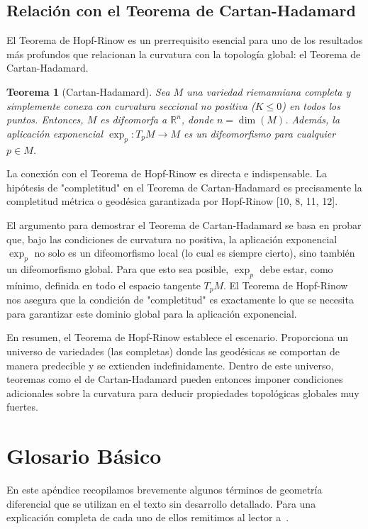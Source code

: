 \documentclass[12pt, a4paper]{report}
\theoremstyle{miestilo}
\newtheorem{teorema}{Teorema}[chapter]
\theoremstyle{midefinicion}
\begin{document}
\section{Relación con el Teorema de Cartan-Hadamard}

El Teorema de Hopf-Rinow es un prerrequisito esencial para uno de los resultados más profundos que relacionan la curvatura con la topología global: el Teorema de Cartan-Hadamard.

\begin{teorema}[Cartan-Hadamard]
Sea $M$ una variedad riemanniana completa y simplemente conexa con curvatura seccional no positiva ($K \le 0$) en todos los puntos. Entonces, $M$ es difeomorfa a $\mathbb{R}^n$, donde $n = \dim(M)$. Además, la aplicación exponencial $\exp_p: T_pM \to M$ es un difeomorfismo para cualquier $p \in M$.
\end{teorema}

La conexión con el Teorema de Hopf-Rinow es directa e indispensable. La hipótesis de "completitud" en el Teorema de Cartan-Hadamard es precisamente la completitud métrica o geodésica garantizada por Hopf-Rinow [10, 8, 11, 12].

El argumento para demostrar el Teorema de Cartan-Hadamard se basa en probar que, bajo las condiciones de curvatura no positiva, la aplicación exponencial $\exp_p$ no solo es un difeomorfismo local (lo cual es siempre cierto), sino también un difeomorfismo global. Para que esto sea posible, $\exp_p$ debe estar, como mínimo, definida en todo el espacio tangente $T_pM$. El Teorema de Hopf-Rinow nos asegura que la condición de "completitud" es exactamente lo que se necesita para garantizar este dominio global para la aplicación exponencial.

En resumen, el Teorema de Hopf-Rinow establece el escenario. Proporciona un universo de variedades (las completas) donde las geodésicas se comportan de manera predecible y se extienden indefinidamente. Dentro de este universo, teoremas como el de Cartan-Hadamard pueden entonces imponer condiciones adicionales sobre la curvatura para deducir propiedades topológicas globales muy fuertes.

\appendix

\chapter{Glosario Básico}

En este apéndice recopilamos brevemente algunos términos de geometría diferencial que se utilizan en el texto sin desarrollo detallado. Para una explicación completa de cada uno de ellos remitimos al lector a~\cite{costa}.
\end{document}
